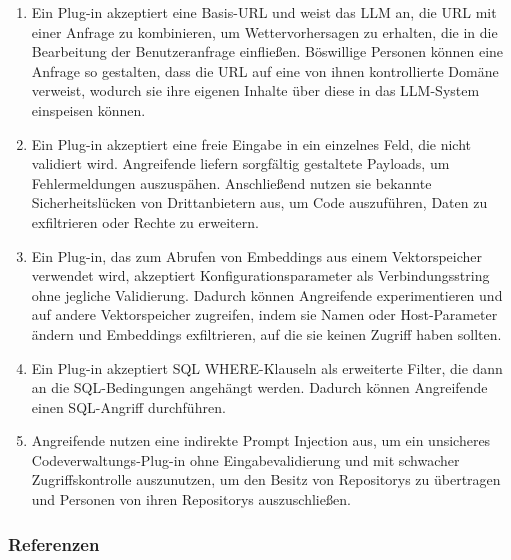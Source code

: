 \documentclass[
]{article}
\providecommand{\tightlist}{%
  \setlength{\itemsep}{0pt}\setlength{\parskip}{0pt}}
\begin{document}
\begin{enumerate}
\def\labelenumi{\arabic{enumi}.}
\tightlist
\item
  Ein Plug-in akzeptiert eine Basis-URL und weist das LLM an, die URL
  mit einer Anfrage zu kombinieren, um Wettervorhersagen zu erhalten,
  die in die Bearbeitung der Benutzeranfrage einfließen. Böswillige
  Personen können eine Anfrage so gestalten, dass die URL auf eine von
  ihnen kontrollierte Domäne verweist, wodurch sie ihre eigenen Inhalte
  über diese in das LLM-System einspeisen können.
\item
  Ein Plug-in akzeptiert eine freie Eingabe in ein einzelnes Feld, die
  nicht validiert wird. Angreifende liefern sorgfältig gestaltete
  Payloads, um Fehlermeldungen auszuspähen. Anschließend nutzen sie
  bekannte Sicherheitslücken von Drittanbietern aus, um Code
  auszuführen, Daten zu exfiltrieren oder Rechte zu erweitern.
\item
  Ein Plug-in, das zum Abrufen von Embeddings aus einem Vektorspeicher
  verwendet wird, akzeptiert Konfigurationsparameter als
  Verbindungsstring ohne jegliche Validierung. Dadurch können
  Angreifende experimentieren und auf andere Vektorspeicher zugreifen,
  indem sie Namen oder Host-Parameter ändern und Embeddings
  exfiltrieren, auf die sie keinen Zugriff haben sollten.
\item
  Ein Plug-in akzeptiert SQL WHERE-Klauseln als erweiterte Filter, die
  dann an die SQL-Bedingungen angehängt werden. Dadurch können
  Angreifende einen SQL-Angriff durchführen.
\item
  Angreifende nutzen eine indirekte Prompt Injection aus, um ein
  unsicheres Codeverwaltungs-Plug-in ohne Eingabevalidierung und mit
  schwacher Zugriffskontrolle auszunutzen, um den Besitz von Repositorys
  zu übertragen und Personen von ihren Repositorys auszuschließen.
\end{enumerate}

\subsubsection{Referenzen}\label{referenzen}
\end{document}
